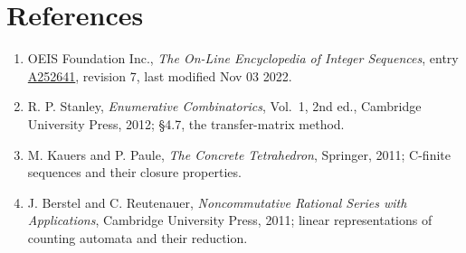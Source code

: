 \documentclass[11pt]{article}
\theoremstyle{definition}
\begin{document}
\section{References}

\begin{enumerate}

\item OEIS Foundation Inc., \emph{The On-Line Encyclopedia of Integer Sequences}, entry \href{https://oeis.org/A252641}{A252641}, revision 7, last modified Nov 03 2022.

\item R. P. Stanley, \emph{Enumerative Combinatorics}, Vol.~1, 2nd ed., Cambridge University Press, 2012; \S4.7, the transfer-matrix method.

\item M. Kauers and P. Paule, \emph{The Concrete Tetrahedron}, Springer, 2011; C-finite sequences and their closure properties.

\item J. Berstel and C. Reutenauer, \emph{Noncommutative Rational Series with Applications}, Cambridge University Press, 2011; linear representations of counting automata and their reduction.

\end{enumerate}
\end{document}
